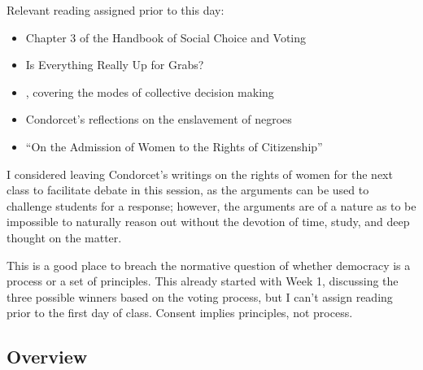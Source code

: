 Relevant reading assigned prior to this day:

\begin{itemize}
    \item Chapter 3 of the Handbook of Social Choice and Voting \autocite[35-51]{Heckelman2015}

    \item Is Everything Really Up for Grabs? \autocite{Kassner2006}

    \item {}, covering the modes of collective decision making \autocite{Tideman2006}

    \item Condorcet's reflections on the enslavement of negroes \autocite{Condorcet1781}

    \item ``On the Admission of Women to the Rights of Citizenship'' \autocite{Condorcet1789}
\end{itemize}

\begin{boxcomment}
    I considered leaving Condorcet's writings on the rights of women for the next class to facilitate debate in this session, as the arguments can be used to challenge students for a response; however, the arguments are of a nature as to be impossible to naturally reason out without the devotion of time, study, and deep thought on the matter.
\end{boxcomment}
\begin{boxcomment}
    This is a good place to breach the normative question of whether democracy is a process or a set of principles.  This already started with Week 1, discussing the three possible winners based on the voting process, but I can't assign reading prior to the first day of class.  Consent implies principles, not process.
\end{boxcomment}
\subsection{Overview}


